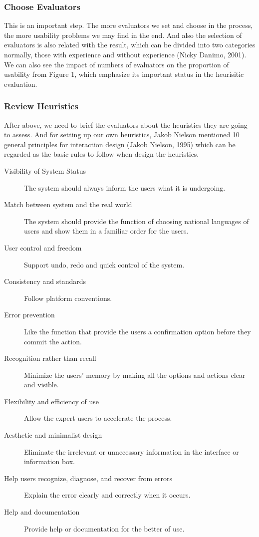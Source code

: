 \documentclass[twocolumn]{article}
\begin{document}
\subsubsection{Choose Evaluators}
This is an important step. The more evaluators we set and choose in the process, the more usability problems we may find in the end. And also the selection of evaluators is also related with the result, which can be divided into two categories normally, those with experience and without experience (Nicky Danimo, 2001). We can also see the impact of numbers of evaluators on the proportion of usability from Figure 1, which emphasize its important status in the heurisitic evaluation.


\subsubsection{Review Heuristics}
After above, we need to brief the evaluators about the heuristics they are going to assess. And for setting up our own heuristics, Jakob Nielson mentioned 10 general principles for interaction design (Jakob Nielson, 1995) which can be regarded as the basic rules to follow when design the heuristics.


\begin{description}
  \item[Visibility of System Status]
    The system should always inform the users what it is undergoing.
  \item[Match between system and the real world]
    The system should provide the function of choosing national languages of users and show them in a familiar order for the users.
  \item[User control and freedom]
    Support undo, redo and quick control of the system.
  \item[Consistency and standards]
    Follow platform conventions.
  \item[Error prevention]
    Like the function that provide the users a confirmation option before they commit the action.
  \item[Recognition rather than recall]
    Minimize the users’ memory by making all the options and actions clear and visible.
  \item[Flexibility and efficiency of use]
    Allow the expert users to accelerate the process.
  \item[Aesthetic and minimalist design]
    Eliminate the irrelevant or unnecessary information in the interface or information box.
  \item[Help users recognize, diagnose, and recover from errors]
    Explain the error clearly and correctly when it occurs.
  \item[Help and documentation]
    Provide help or documentation for the better of use.
\end{description}
\end{document}
